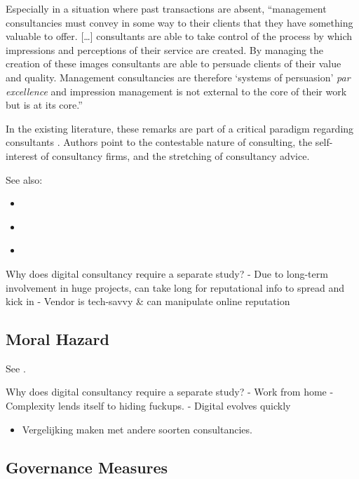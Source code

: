 \documentclass[12pt]{article}
\providecommand{\tightlist}{%
  \setlength{\itemsep}{0pt}\setlength{\parskip}{0pt}}
\begin{document}
Especially in a situation where past transactions are absent,
``management consultancies must convey in some way to their clients that
they have something valuable to offer. {[}\ldots{]} consultants are able
to take control of the process by which impressions and perceptions of
their service are created. By managing the creation of these images
consultants are able to persuade clients of their value and quality.
Management consultancies are therefore `systems of persuasion' \emph{par
excellence} and impression management is not external to the core of
their work but is at its core.'' \citep[ 35]{clark1998}

In the existing literature, these remarks are part of a critical
paradigm regarding consultants \citep[ 4-5]{armbruster2006}. Authors
point to the contestable nature of consulting, the self-interest of
consultancy firms, and the stretching of consultancy advice.

See also:

\begin{itemize}
\tightlist
\item
  \citep{wright2002}
\item
  \citep{david2013}
\item
  \citep{mahoney2016}
\end{itemize}

Why does digital consultancy require a separate study? - Due to
long-term involvement in huge projects, can take long for reputational
info to spread and kick in - Vendor is tech-savvy \& can manipulate
online reputation

\hypertarget{moral-hazard}{%
\subsection{Moral Hazard}\label{moral-hazard}}

See \citep[ 72-73]{armbruster2006}.

Why does digital consultancy require a separate study? - Work from home
- Complexity lends itself to hiding fuckups. - Digital evolves quickly

\begin{itemize}
\tightlist
\item
  Vergelijking maken met andere soorten consultancies.
\end{itemize}

\hypertarget{governance-measures}{%
\subsection{Governance Measures}\label{governance-measures}}
\end{document}
